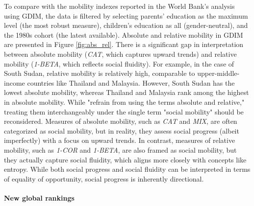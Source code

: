 To compare with the mobility indexes reported in the World Bank's analysis using GDIM, the data is filtered by selecting parents' education as the maximum level (the most robust measure), children's education as all (gender-neutral), and the 1980s cohort (the latest available). Absolute and relative mobility in GDIM are presented in Figure \ref{fig:abs_rel}. There is a significant gap in interpretation between absolute mobility (\textit{CAT}, which captures upward trends) and relative mobility (\textit{1-BETA}, which reflects social fluidity). For example, in the case of South Sudan, relative mobility is relatively high, comparable to upper-middle-income countries like Thailand and Malaysia. However, South Sudan has the lowest absolute mobility, whereas Thailand and Malaysia rank among the highest in absolute mobility. While \citet{van2024intergenerational} "refrain from using the terms absolute and relative," treating them interchangeably under the single term "social mobility" should be reconsidered. Measures of absolute mobility, such as \textit{CAT} and \textit{MIX}, are often categorized as social mobility, but in reality, they assess social progress (albeit imperfectly) with a focus on upward trends. In contrast, measures of relative mobility, such as \textit{1-COR} and \textit{1-BETA}, are also framed as social mobility, but they actually capture social fluidity, which aligns more closely with concepts like entropy. While both social progress and social fluidity can be interpreted in terms of equality of opportunity, social progress is inherently directional.

\paragraph{New global rankings}

